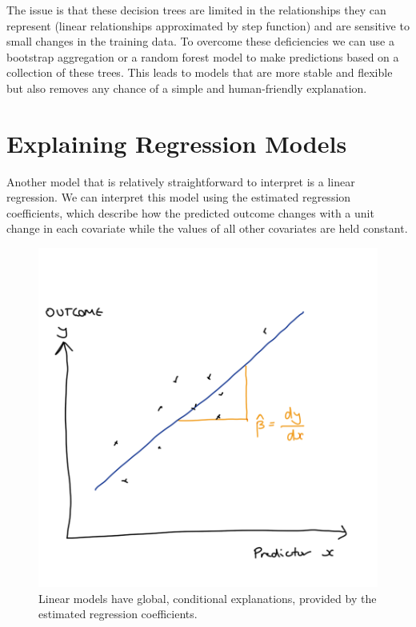 \documentclass[
  12pt,
]{book}
\begin{document}
The issue is that these decision trees are limited in the relationships they can represent (linear relationships approximated by step function) and are sensitive to small changes in the training data. To overcome these deficiencies we can use a bootstrap aggregation or a random forest model to make predictions based on a collection of these trees. This leads to models that are more stable and flexible but also removes any chance of a simple and human-friendly explanation.

\hypertarget{explaining-regression-models}{%
\section{Explaining Regression Models}\label{explaining-regression-models}}

Another model that is relatively straightforward to interpret is a linear regression. We can interpret this model using the estimated regression coefficients, which describe how the predicted outcome changes with a unit change in each covariate while the values of all other covariates are held constant.

\begin{figure}

{\centering \includegraphics[width=12.5in]{images/402-production-explainability/interpreting-linear-regression} 

}

\caption{Linear models have global, conditional explanations, provided by the estimated regression coefficients.}\label{fig:unnamed-chunk-3}
\end{figure}
\end{document}
